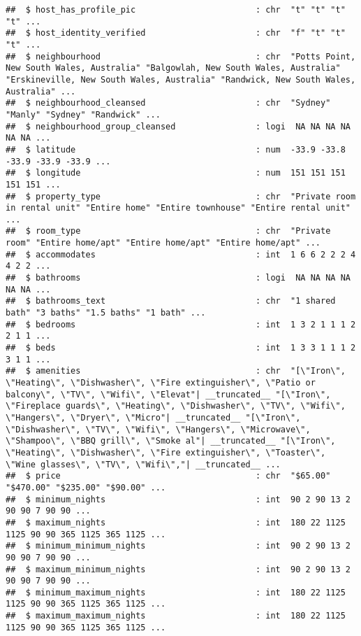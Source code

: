 \documentclass[
]{article}
\begin{document}
\begin{verbatim}
##  $ host_has_profile_pic                        : chr  "t" "t" "t" "t" ...
##  $ host_identity_verified                      : chr  "f" "t" "t" "t" ...
##  $ neighbourhood                               : chr  "Potts Point, New South Wales, Australia" "Balgowlah, New South Wales, Australia" "Erskineville, New South Wales, Australia" "Randwick, New South Wales, Australia" ...
##  $ neighbourhood_cleansed                      : chr  "Sydney" "Manly" "Sydney" "Randwick" ...
##  $ neighbourhood_group_cleansed                : logi  NA NA NA NA NA NA ...
##  $ latitude                                    : num  -33.9 -33.8 -33.9 -33.9 -33.9 ...
##  $ longitude                                   : num  151 151 151 151 151 ...
##  $ property_type                               : chr  "Private room in rental unit" "Entire home" "Entire townhouse" "Entire rental unit" ...
##  $ room_type                                   : chr  "Private room" "Entire home/apt" "Entire home/apt" "Entire home/apt" ...
##  $ accommodates                                : int  1 6 6 2 2 2 4 4 2 2 ...
##  $ bathrooms                                   : logi  NA NA NA NA NA NA ...
##  $ bathrooms_text                              : chr  "1 shared bath" "3 baths" "1.5 baths" "1 bath" ...
##  $ bedrooms                                    : int  1 3 2 1 1 1 2 2 1 1 ...
##  $ beds                                        : int  1 3 3 1 1 1 2 3 1 1 ...
##  $ amenities                                   : chr  "[\"Iron\", \"Heating\", \"Dishwasher\", \"Fire extinguisher\", \"Patio or balcony\", \"TV\", \"Wifi\", \"Elevat"| __truncated__ "[\"Iron\", \"Fireplace guards\", \"Heating\", \"Dishwasher\", \"TV\", \"Wifi\", \"Hangers\", \"Dryer\", \"Micro"| __truncated__ "[\"Iron\", \"Dishwasher\", \"TV\", \"Wifi\", \"Hangers\", \"Microwave\", \"Shampoo\", \"BBQ grill\", \"Smoke al"| __truncated__ "[\"Iron\", \"Heating\", \"Dishwasher\", \"Fire extinguisher\", \"Toaster\", \"Wine glasses\", \"TV\", \"Wifi\","| __truncated__ ...
##  $ price                                       : chr  "$65.00" "$470.00" "$235.00" "$90.00" ...
##  $ minimum_nights                              : int  90 2 90 13 2 90 90 7 90 90 ...
##  $ maximum_nights                              : int  180 22 1125 1125 90 90 365 1125 365 1125 ...
##  $ minimum_minimum_nights                      : int  90 2 90 13 2 90 90 7 90 90 ...
##  $ maximum_minimum_nights                      : int  90 2 90 13 2 90 90 7 90 90 ...
##  $ minimum_maximum_nights                      : int  180 22 1125 1125 90 90 365 1125 365 1125 ...
##  $ maximum_maximum_nights                      : int  180 22 1125 1125 90 90 365 1125 365 1125 ...

\end{verbatim}
\end{document}
